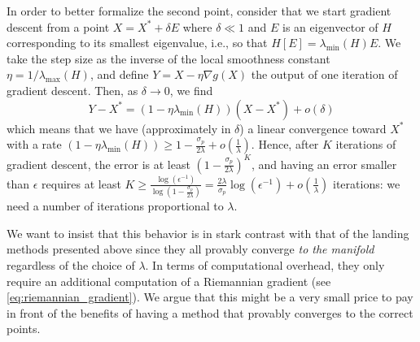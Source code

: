 \documentclass[twoside,11pt]{article}
\newcommand{\revision}[1]{{#1}}
\begin{document}
In order to better formalize the second point, consider that we start gradient descent from a point $X = X^* +\delta E$ where $\delta \ll 1$ and $E$ is an eigenvector of $H$ corresponding to its smallest eigenvalue, i.e., so that $H[E] = \lambda_{\min}(H)E$. We take the step size as the inverse of the local smoothness constant $\eta =1/\lambda_{\max}(H)$, and define $Y = X  -\eta \nabla g(X)$ the output of one iteration of gradient descent. Then, as $\delta \to 0$, we find 
$$
Y - X^* = (1 - \eta \lambda_{\min}(H))(X - X^*) + o(\delta)
$$
which means that we have (approximately in $\delta$) a linear convergence toward $X^*$ with a rate $(1 - \eta \lambda_{\min}(H)) \geq 1 -\frac{\sigma_p}{2\lambda} +o(\frac1\lambda)$. Hence, after $K$ iterations of gradient descent, the error is at least
$(1 -\frac{\sigma_p}{2\lambda})^K$, and having an error smaller than $\epsilon$ requires at least $K \geq \frac{\log(\epsilon^{-1})}{\log(1 - \frac{\sigma_p}{2\lambda})} = \frac{2\lambda}{\sigma_p}\log(\epsilon^{-1}) + o(\frac1\lambda)$ iterations: we need a number of iterations proportional to $\lambda$.

%
%
%
%
%
%
%
%
%
%


%
%

%


\revision{We want to insist that this behavior is in stark contrast with that of the landing methods presented above since they all provably converge \emph{to the manifold} regardless of the choice of $\lambda$.
In terms of computational overhead, they only require an additional computation of a Riemannian gradient (see \autoref{eq:riemannian_gradient}).
We argue that this might be a very small price to pay in front of the benefits of having a method that provably converges to the correct points.}
\end{document}
